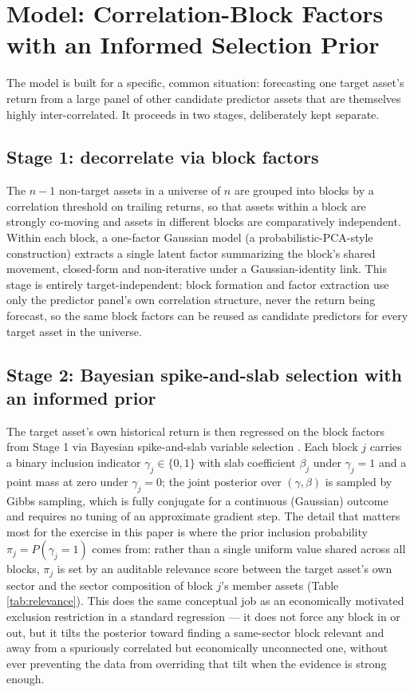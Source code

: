 \documentclass[11pt]{article}
\begin{document}
\section{Model: Correlation-Block Factors with an Informed Selection Prior}
\label{sec:model}

The model is built for a specific, common situation: forecasting one
target asset's return from a large panel of other candidate predictor
assets that are themselves highly inter-correlated. It proceeds in two
stages, deliberately kept separate.

\subsection{Stage 1: decorrelate via block factors}
The $n-1$ non-target assets in a universe of $n$ are grouped into blocks
by a correlation threshold on trailing returns, so that assets within a
block are strongly co-moving and assets in different blocks are
comparatively independent. Within each block, a one-factor Gaussian model
(a probabilistic-PCA-style construction) extracts a single latent factor
summarizing the block's shared movement, closed-form and non-iterative
under a Gaussian-identity link. This stage is entirely
target-independent: block formation and factor extraction use only the
predictor panel's own correlation structure, never the return being
forecast, so the same block factors can be reused as candidate predictors
for every target asset in the universe.

\subsection{Stage 2: Bayesian spike-and-slab selection with an informed prior}
The target asset's own historical return is then regressed on the block
factors from Stage 1 via Bayesian spike-and-slab variable selection
\citep{mitchellbeauchamp1988,georgemcculloch1993,ishwaranrao2005}. Each block
$j$ carries a binary inclusion indicator $\gamma_j \in \{0,1\}$ with slab
coefficient $\beta_j$ under $\gamma_j=1$ and a point mass at zero under
$\gamma_j=0$; the joint posterior over $(\gamma,\beta)$ is sampled by
Gibbs sampling, which is fully conjugate for a continuous (Gaussian)
outcome and requires no tuning of an approximate gradient step. The
detail that matters most for the exercise in this paper is where the
prior inclusion probability $\pi_j = P(\gamma_j = 1)$ comes from: rather
than a single uniform value shared across all blocks, $\pi_j$ is set by
an auditable relevance score between the target asset's own sector and
the sector composition of block $j$'s member assets (Table
\ref{tab:relevance}). This does the same conceptual job as an
economically motivated exclusion restriction in a standard regression ---
it does not force any block in or out, but it tilts the posterior toward
finding a same-sector block relevant and away from a spuriously
correlated but economically unconnected one, without ever preventing the
data from overriding that tilt when the evidence is strong enough.
\end{document}
